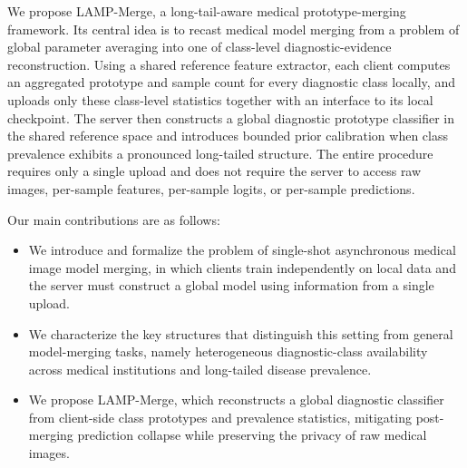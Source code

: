 \documentclass[letterpaper]{article} %
\begin{document}
We propose LAMP-Merge, a long-tail-aware medical prototype-merging framework. Its central idea is to recast medical model merging from a problem of global parameter averaging into one of class-level diagnostic-evidence reconstruction. Using a shared reference feature extractor, each client computes an aggregated prototype and sample count for every diagnostic class locally, and uploads only these class-level statistics together with an interface to its local checkpoint. The server then constructs a global diagnostic prototype classifier in the shared reference space and introduces bounded prior calibration when class prevalence exhibits a pronounced long-tailed structure. The entire procedure requires only a single upload and does not require the server to access raw images, per-sample features, per-sample logits, or per-sample predictions.

Our main contributions are as follows:
\begin{itemize}
    \item We introduce and formalize the problem of single-shot asynchronous medical image model merging, in which clients train independently on local data and the server must construct a global model using information from a single upload. 
    \item We characterize the key structures that distinguish this setting from general model-merging tasks, namely heterogeneous diagnostic-class availability across medical institutions and long-tailed disease prevalence. \item We propose LAMP-Merge, which reconstructs a global diagnostic classifier from client-side class prototypes and prevalence statistics, mitigating post-merging prediction collapse while preserving the privacy of raw medical images. 
\end{itemize}
\end{document}

